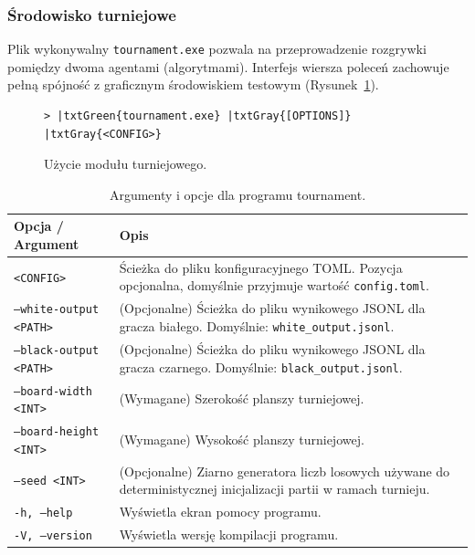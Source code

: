 \documentclass{article}
\begin{document}
\subsubsection{Środowisko turniejowe}

Plik wykonywalny \texttt{tournament.exe} pozwala na przeprowadzenie rozgrywki pomiędzy dwoma agentami (algorytmami). Interfejs wiersza poleceń zachowuje pełną spójność z graficznym środowiskiem testowym (Rysunek~\ref{fig:tournament-run}).

\begin{figure}[H]
\small
\centering
\begin{Verbatim}[commandchars=\|\{\}]
> |txtGreen{tournament.exe} |txtGray{[OPTIONS]} |txtGray{<CONFIG>}
\end{Verbatim}
\caption{Użycie modułu turniejowego.}
\label{fig:tournament-run}
\end{figure}

\begin{table}[H]
    \centering
    \caption{Argumenty i opcje dla programu tournament.}
    \label{tab:tournament-args}
    \renewcommand{\arraystretch}{1.2}
    \begin{tabularx}{\textwidth}{|l|X|}
        \hline
        \textbf{Opcja / Argument} & \textbf{Opis} \\
        \hline
        \texttt{<CONFIG>} & Ścieżka do pliku konfiguracyjnego TOML. Pozycja opcjonalna, domyślnie przyjmuje wartość \texttt{config.toml}. \\
        \texttt{---white-output <PATH>} & (Opcjonalne) Ścieżka do pliku wynikowego JSONL dla gracza białego. Domyślnie: \texttt{white\_output.jsonl}. \\
        \texttt{---black-output <PATH>} & (Opcjonalne) Ścieżka do pliku wynikowego JSONL dla gracza czarnego. Domyślnie: \texttt{black\_output.jsonl}. \\
        \texttt{---board-width <INT>} & (Wymagane) Szerokość planszy turniejowej. \\
        \texttt{---board-height <INT>} & (Wymagane) Wysokość planszy turniejowej. \\
        \texttt{---seed <INT>} & (Opcjonalne) Ziarno generatora liczb losowych używane do deterministycznej inicjalizacji partii w ramach turnieju. \\
        \texttt{-h, ---help} & Wyświetla ekran pomocy programu. \\
        \texttt{-V, ---version} & Wyświetla wersję kompilacji programu. \\
        \hline
    \end{tabularx}
\end{table}
\end{document}
